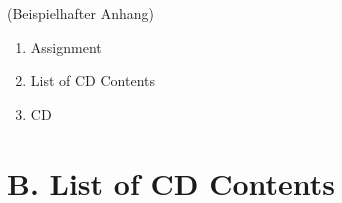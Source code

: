 
\addchap{\langanhang}

(Beispielhafter Anhang)
 

{\Large
\begin{enumerate}[label=\Alph*.]
	\item Assignment
	\item List of CD Contents
	\item CD 
\end{enumerate}
}
\pagebreak
\pagebreak
\section*{B. List of CD Contents}
